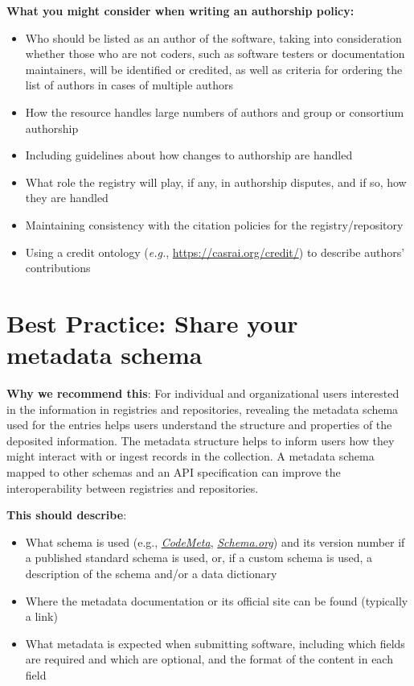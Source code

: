 \documentclass[11pt]{article}
\begin{document}
\textbf{What you might consider when writing an authorship policy:}

\begin{itemize}
\item Who should be listed as an author of the software, taking into consideration whether those who are not coders, such as software testers or documentation maintainers, will be identified or credited, as well as criteria for ordering the list of authors in cases of multiple authors

\item How the resource handles large numbers of authors and group or consortium authorship

\item Including guidelines about how changes to authorship are handled

\item What role the registry will play, if any, in authorship disputes, and if so, how they are handled

\item Maintaining consistency with the citation policies for the registry/repository

\item Using a credit ontology (\emph{e.g.}, \url{https://casrai.org/credit/}) to describe authors' contributions

\end{itemize}


\section{Best Practice: Share your metadata schema}
\label{best-practice-share-your-metadata-schema}

\textbf{Why we recommend this}: For individual and organizational users interested in the information in registries and repositories, revealing the metadata schema used for the entries helps users understand the structure and properties of the deposited information. The metadata structure helps to inform users how they might interact with or ingest records in the collection. A metadata schema mapped to other schemas and an API specification can improve the interoperability between registries and repositories.

\textbf{This should describe}:

\begin{itemize}
\item What schema is used (e.g., \href{https://codemeta.github.io/}{\emph{CodeMeta}}, \href{https://schema.org/}{\emph{Schema.org}}) and its version number if a published standard schema is used, or, if a custom schema is used, a description of the schema and/or a data dictionary

\item Where the metadata documentation or its official site can be found (typically a link)

\item What metadata is expected when submitting software, including which fields are required and which are optional, and the format of the content in each field

\end{itemize}
\end{document}
